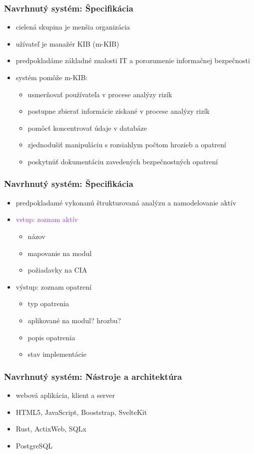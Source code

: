 \documentclass[11pt,xcolor={dvipsnames},hyperref={pdftex,pdfpagemode=UseNone,hidelinks,pdfdisplaydoctitle=true},usepdftitle=false]{beamer}
\begin{document}
\begin{frame}
	\frametitle{Navrhnutý systém: Špecifikácia}
	\begin{itemize}
		\item cielená skupina je menšia organizácia
		\item užívateľ je manažér KIB (m-KIB)
		\item predpokladáme základné znalosti IT a porozumenie informačnej bezpečnosti
		\item systém pomôže m-KIB:
			\begin{itemize}
				\item usmerňovať používateľa v procese analýzy rizík
				\item postupne zbierať informácie získané v procese analýzy rizík
				\item pomôcť koncentrovať údaje v databáze
				\item zjednodušiť manipuláciu s rozsiahlym počtom hrozieb a opatrení
				\item poskytnúť dokumentáciu zavedených bezpečnostných opatrení
			\end{itemize}
	\end{itemize}
\end{frame}
\begin{frame}
	\frametitle{Navrhnutý systém: Špecifikácia}
	\begin{itemize}
		\item predpokladamé vykonanú štrukturovaná analýzu a namodelovanie aktív
		\item \textcolor{BlueViolet}{vstup: zoznam aktív}
			\begin{itemize}
				\item názov
				\item mapovanie na modul
				\item požiadavky na CIA
			\end{itemize}
		\item \textcolor{RedViolet}{výstup: zoznam opatrení}
			\begin{itemize}
				\item typ opatrenia
				\item aplikované na modul? hrozbu?
				\item popis opatrenia
				\item stav implementácie
			\end{itemize}
	\end{itemize}
\end{frame}
\begin{frame}
	\frametitle{Navrhnutý systém: Nástroje a architektúra}
	\begin{itemize}
		\item webová aplikácia, klient a server
		\item HTML5, JavaScript, Booststrap, SvelteKit
		\item Rust, ActixWeb, SQLx
		\item PostgreSQL
	\end{itemize}
\end{frame}
\end{document}
